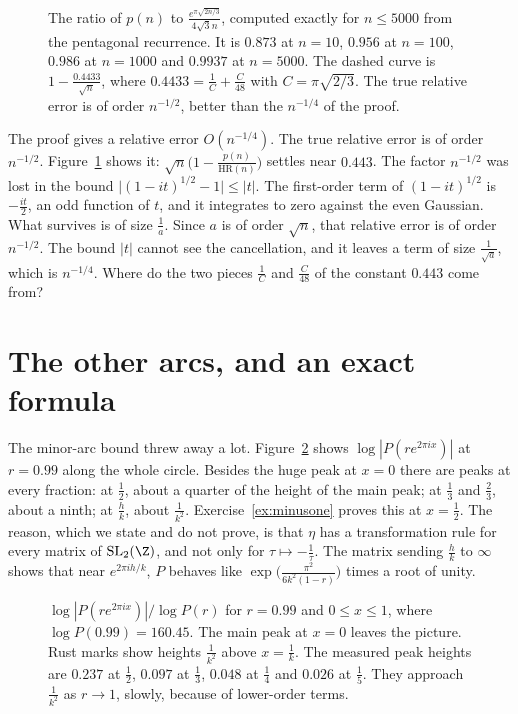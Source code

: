 \begin{figure}[ht]
\centering
{}
\caption{The ratio of $p(n)$ to $\frac{e^{\pi\sqrt{2n/3}}}{4\sqrt3n}$, computed exactly for $n\le5000$ from the pentagonal recurrence. It is $0.873$ at $n=10$, $0.956$ at $n=100$, $0.986$ at $n=1000$ and $0.9937$ at $n=5000$. The dashed curve is $1-\frac{0.4433}{\sqrt n}$, where $0.4433=\frac1C+\frac C{48}$ with $C=\pi\sqrt{2/3}$. The true relative error is of order $n^{-1/2}$, better than the $n^{-1/4}$ of the proof.}
\label{fig:hrratio}
\end{figure}

\begin{think}
The proof gives a relative error $O(n^{-1/4})$. The true relative error is of order $n^{-1/2}$. Figure~\ref{fig:hrratio} shows it: $\sqrt n\bigl(1-\frac{p(n)}{\mathrm{HR}(n)}\bigr)$ settles near $0.443$. The factor $n^{-1/2}$ was lost in the bound $\bigl|(1-it)^{1/2}-1\bigr|\le|t|$. The first-order term of $(1-it)^{1/2}$ is $-\frac{it}2$, an odd function of $t$, and it integrates to zero against the even Gaussian. What survives is of size $\frac1a$. Since $a$ is of order $\sqrt n$, that relative error is of order $n^{-1/2}$. The bound $|t|$ cannot see the cancellation, and it leaves a term of size $\frac1{\sqrt a}$, which is $n^{-1/4}$. Where do the two pieces $\frac1C$ and $\frac C{48}$ of the constant $0.443$ come from?
\end{think}

\section{The other arcs, and an exact formula}

The minor-arc bound threw away a lot. Figure~\ref{fig:circlearcs} shows $\log|P(re^{2\pi ix})|$ at $r=0.99$ along the whole circle. Besides the huge peak at $x=0$ there are peaks at every fraction: at $\frac12$, about a quarter of the height of the main peak; at $\frac13$ and $\frac23$, about a ninth; at $\frac hk$, about $\frac1{k^2}$. Exercise~\ref{ex:minusone} proves this at $x=\frac12$. The reason, which we state and do not prove, is that $\eta$ has a transformation rule for every matrix of $\mathrm{SL}_2(\Z)$, and not only for $\tau\mapsto-\frac1\tau$. The matrix sending $\frac hk$ to $\infty$ shows that near $e^{2\pi ih/k}$, $P$ behaves like $\exp\bigl(\frac{\pi^2}{6k^2(1-r)}\bigr)$ times a root of unity.

\begin{figure}[ht]
\centering
{}
\caption{$\log|P(re^{2\pi ix})|/\log P(r)$ for $r=0.99$ and $0\le x\le1$, where $\log P(0.99)=160.45$. The main peak at $x=0$ leaves the picture. Rust marks show heights $\frac1{k^2}$ above $x=\frac1k$. The measured peak heights are $0.237$ at $\frac12$, $0.097$ at $\frac13$, $0.048$ at $\frac14$ and $0.026$ at $\frac15$. They approach $\frac1{k^2}$ as $r\to1$, slowly, because of lower-order terms.}
\label{fig:circlearcs}
\end{figure}

